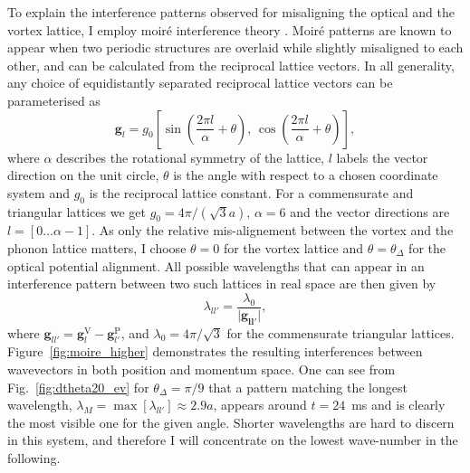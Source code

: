     To explain the interference patterns observed for misaligning the optical and the vortex lattice, I employ moir\'e interference theory \cite{SS:Hermann_jpcm_2012}. Moir\'e patterns are known to appear when two periodic structures are overlaid while slightly misaligned to each other, and can be calculated from the reciprocal lattice vectors. In all generality, any choice of equidistantly separated reciprocal lattice vectors can be parameterised as
    	\begin{equation}
    		\mathbf{g}_{l} = g_0 \left[ \sin\left( \frac{2\pi l}{\alpha}+\theta \right),\, \cos\left( \frac{2\pi l}{\alpha} +\theta\right) \right],
    	\end{equation}
    where $\alpha$ describes the rotational symmetry of the lattice, $l$ labels the vector direction on the unit circle, $\theta$ is the angle with respect to a chosen coordinate system and $g_0$ is the reciprocal lattice constant. For a commensurate and triangular lattices we get $g_0=4\pi/(\sqrt{3}a)$, $\alpha=6$ and the vector directions are $l=\left[0\dots\alpha-1\right]$. As only the relative mis-alignement between the vortex and the phonon lattice matters, I choose $\theta=0$ for the vortex lattice and $\theta=\theta_\Delta$ for the optical potential alignment.
    All possible wavelengths that can appear in an interference pattern between two such lattices in real space are then given by
    	\begin{equation}
    		\lambda_{ll'} = \frac{\lambda_0}{|\mathbf{\mathbf{g}_{ll'}|}},
    		\label{eq:InterferenceVectors}
    	\end{equation}
    where
    $\mathbf{g}_{ll'}=\mathbf{g}_{l}^{\text{V}}-\mathbf{g}_{l'}^{\text{P}}$, and
    $\lambda_0 = 4\pi/\sqrt{3}$ for the commensurate triangular lattices. Figure~\ref{fig:moire_higher} demonstrates the resulting interferences between wavevectors in both position and momentum space. One can see from Fig.~\ref{fig:dtheta20_ev} for $\theta_\Delta = \pi/9$ that a pattern matching the longest wavelength, $\lambda_M= \max[\lambda_{ll'}] \approx 2.9 a$, appears around $t=24$~ms and is clearly the most visible one for the given angle. Shorter wavelengths are hard to discern in this system, and therefore I will concentrate on the lowest wave-number in the following.

